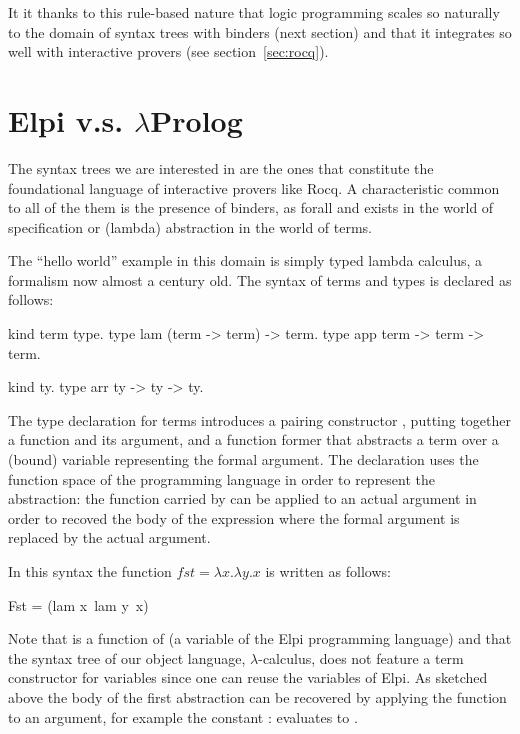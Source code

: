 \documentclass[a4paper, 11pt]{book}
\begin{document}
It it thanks to this rule-based nature that logic programming scales so
naturally to the domain of syntax trees with binders (next section)
and that it integrates so well with interactive provers (see section~\ref{sec:rocq}).

\section{Elpi v.s. $\lambda$Prolog}\label{sec:hello}

The syntax trees we are interested in are the ones that constitute
the foundational language of interactive provers like Rocq. A characteristic common
to all of the them is the presence of binders, as forall and exists in
the world of specification or (lambda) abstraction in the world of terms.

The ``hello world'' example in this domain is simply typed lambda calculus,
a formalism now almost a century old. The syntax of terms and types
is declared as follows:

\begin{elpicode}
kind term type.
type lam (term -> term) -> term.
type app term -> term -> term.

kind ty.
type arr ty -> ty -> ty.
\end{elpicode}

The type declaration for terms introduces a pairing constructor ,
putting together a function and its argument, and a function former
 that abstracts a term over a (bound) variable representing the
formal argument. The declaration uses the function space of
the programming language in order to represent the abstraction:
the function carried by  can be applied to an actual argument in order
to recoved the body of the expression where the formal argument is
replaced by the actual argument.

In this syntax the function $fst = \lambda x.\lambda y.x$ is written as follows:

\begin{elpicode}
Fst = (lam x\ lam y\ x)
\end{elpicode}

Note that  is a function of  (a
variable of the Elpi programming language)
and that the syntax tree of our object language, $\lambda$-calculus, does not
feature a term constructor for variables since one can reuse the variables
of Elpi.
As sketched above the body of the first abstraction
can be recovered by applying the function to an argument, for
example the constant : 
evaluates to .
\end{document}
